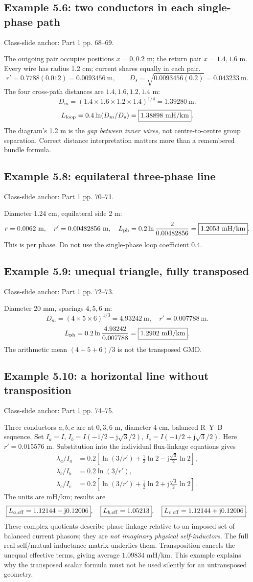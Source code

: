 \documentclass[11pt,a4paper]{article}
\newcommand{\slides}[1]{{\small\color{muted}\textsf{Class-slide anchor: #1.}}\par}
\newcommand{\ans}[1]{\boxed{#1}}
\newcommand{\jj}{\mathrm j}
\begin{document}
\subsection{Example 5.6: two conductors in each single-phase path}
\slides{Part 1 pp. 68--69}
The outgoing pair occupies positions $x=0,0.2$ m; the return pair $x=1.4,1.6$ m. Every wire has radius 1.2 cm; current shares equally in each pair.
\[
 r'=0.7788(0.012)=0.0093456\ \mathrm m,\qquad
 D_s=\sqrt{0.0093456(0.2)}=0.043233\ \mathrm m.
\]
The four cross-path distances are $1.4,1.6,1.2,1.4$ m:
\[
 D_m=(1.4\times1.6\times1.2\times1.4)^{1/4}=1.39280\ \mathrm m.
\]
\[
 L_{\rm loop}=0.4\ln(D_m/D_s)=\ans{1.38898\ \mathrm{mH/km}}.
\]
The diagram's 1.2 m is the \emph{gap between inner wires}, not centre-to-centre group separation. Correct distance interpretation matters more than a remembered bundle formula.
\subsection{Example 5.8: equilateral three-phase line}
\slides{Part 1 pp. 70--71}
Diameter 1.24 cm, equilateral side 2 m:
\[
 r=0.0062\ \mathrm m,\quad r'=0.00482856\ \mathrm m,\quad
 L_{\rm ph}=0.2\ln\frac2{0.00482856}=\ans{1.2053\ \mathrm{mH/km}}.
\]
This is per phase. Do not use the single-phase loop coefficient 0.4.
\subsection{Example 5.9: unequal triangle, fully transposed}
\slides{Part 1 pp. 72--73}
Diameter 20 mm, spacings $4,5,6$ m:
\[
 D_m=(4\times5\times6)^{1/3}=4.93242\ \mathrm m,\quad r'=0.007788\ \mathrm m.
\]
\[
 L_{\rm ph}=0.2\ln\frac{4.93242}{0.007788}=\ans{1.2902\ \mathrm{mH/km}}.
\]
The arithmetic mean $(4+5+6)/3$ is not the transposed GMD.
\subsection{Example 5.10: a horizontal line without transposition}
\slides{Part 1 pp. 74--75}
Three conductors $a,b,c$ are at $0,3,6$ m, diameter 4 cm, balanced R--Y--B sequence. Set $I_a=I$, $I_b=I(-1/2-\jj\sqrt3/2)$, $I_c=I(-1/2+\jj\sqrt3/2)$. Here $r'=0.015576$ m. Substitution into the individual flux-linkage equations gives
\[
 \begin{aligned}
 \lambda_a/I_a&=0.2\left[\ln(3/r')+\tfrac12\ln2-\jj\tfrac{\sqrt3}{2}\ln2\right],\\
 \lambda_b/I_b&=0.2\ln(3/r'),\\
 \lambda_c/I_c&=0.2\left[\ln(3/r')+\tfrac12\ln2+\jj\tfrac{\sqrt3}{2}\ln2\right].
 \end{aligned}
\]
The units are mH/km; results are
\[
 \ans{L_{a,\rm eff}=1.12144-\jj0.12006},\quad
 \ans{L_{b,\rm eff}=1.05213},\quad
 \ans{L_{c,\rm eff}=1.12144+\jj0.12006}.
\]
These complex quotients describe phase linkage relative to an imposed set of balanced current phasors; they are \emph{not imaginary physical self-inductors}. The full real self/mutual inductance matrix underlies them. Transposition cancels the unequal effective terms, giving average $1.09834$ mH/km. This example explains why the transposed scalar formula must not be used silently for an untransposed geometry.
\end{document}
